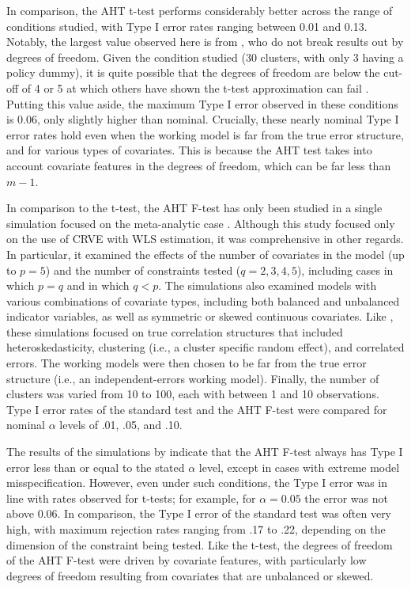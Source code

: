 \documentclass[12pt]{article}
\begin{document}
In comparison, the AHT t-test performs considerably better across the range of conditions studied, with Type I error rates ranging between 0.01 and 0.13.
Notably, the largest value observed here is from \citet{Imbens2015robust}, who do not break results out by degrees of freedom. 
Given the condition studied (30 clusters, with only 3 having a policy dummy), it is quite possible that the degrees of freedom are below the cut-off of 4 or 5 at which others have shown the t-test approximation can fail \citep{Tipton2015small-t}. 
Putting this value aside, the maximum Type I error observed in these conditions is 0.06, only slightly higher than nominal.
Crucially, these nearly nominal Type I error rates hold even when the working model is far from the true error structure, and for various types of covariates.
This is because the AHT test takes into account covariate features in the degrees of freedom, which can be far less than $m - 1$.

In comparison to the t-test, the AHT F-test has only been studied in a single simulation focused on the meta-analytic case \citep{Tipton2015small-F}.
Although this study focused only on the use of CRVE with WLS estimation, it was comprehensive in other regards.
In particular, it examined the effects of the number of covariates in the model (up to $p = 5$) and the number of constraints tested ($q = 2,3,4,5$), including cases in which $p = q$ and in which $q < p$. 
The simulations also examined models with various combinations of covariate types, including both balanced and unbalanced indicator variables, as well as symmetric or skewed continuous covariates.
Like \citet{Tipton2015small-t}, these simulations focused on true correlation structures that included heteroskedasticity, clustering (i.e., a cluster specific random effect), and correlated errors.
The working models were then chosen to be far from the true error structure (i.e., an independent-errors working model).
Finally, the number of clusters was varied from 10 to 100, each with between 1 and 10 observations. 
Type I error rates of the standard test and the AHT F-test were compared for nominal $\alpha$ levels of .01, .05, and .10.

The results of the simulations by \citet{Tipton2015small-F} indicate that the AHT F-test always has Type I error less than or equal to the stated $\alpha$ level, except in cases with extreme model misspecification. 
However, even under such conditions, the Type I error was in line with rates observed for t-tests; for example, for $\alpha = 0.05$ the error was not above 0.06. 
In comparison, the Type I error of the standard test was often very high, with maximum rejection rates ranging from .17 to .22, depending on the dimension of the constraint being tested.
Like the t-test, the degrees of freedom of the AHT F-test were driven by covariate features, with particularly low degrees of freedom resulting from covariates that are unbalanced or skewed.
\end{document}
